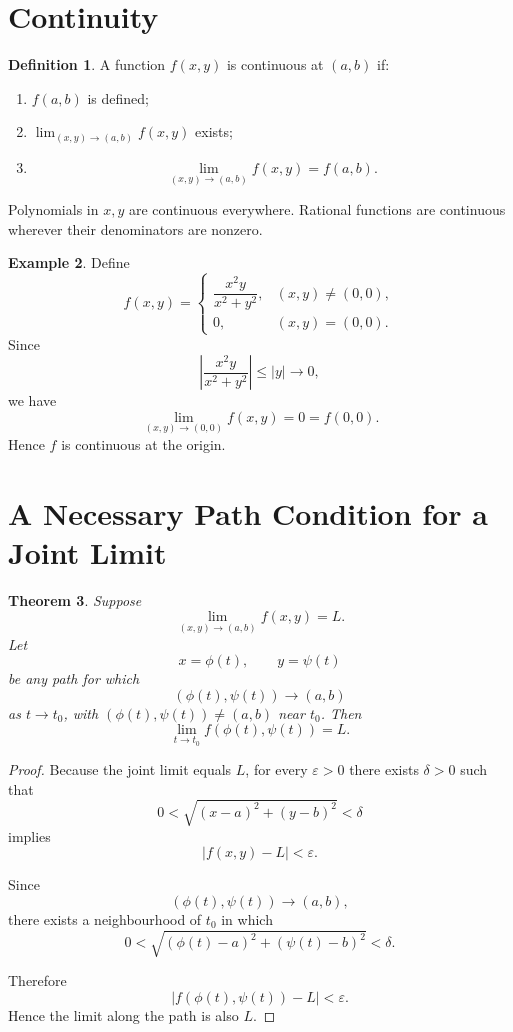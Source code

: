 \documentclass[11pt,oneside]{book}
\theoremstyle{studentthm}
\newtheorem{theorem}{Theorem}[chapter]
\theoremstyle{definition}
\newtheorem{definition}[theorem]{Definition}
\newtheorem{example}[theorem]{Example}
\newcommand{\eps}{\varepsilon}
\newcommand{\abs}[1]{\left|#1\right|}
\begin{document}
\section{Continuity}

\begin{definition}
A function \(f(x,y)\) is continuous at \((a,b)\) if:
\begin{enumerate}
\item \(f(a,b)\) is defined;
\item \(\lim_{(x,y)\to(a,b)}f(x,y)\) exists;
\item
\[
\lim_{(x,y)\to(a,b)}f(x,y)=f(a,b).
\]
\end{enumerate}
\end{definition}

Polynomials in \(x,y\) are continuous everywhere. Rational functions
are continuous wherever their denominators are nonzero.

\begin{example}
Define
\[
f(x,y)=
\begin{cases}
\dfrac{x^2y}{x^2+y^2},&(x,y)\ne(0,0),\\[1ex]
0,&(x,y)=(0,0).
\end{cases}
\]
Since
\[
\abs{\frac{x^2y}{x^2+y^2}}
\le\abs{y}\to0,
\]
we have
\[
\lim_{(x,y)\to(0,0)}f(x,y)=0=f(0,0).
\]
Hence \(f\) is continuous at the origin.
\end{example}


\section{A Necessary Path Condition for a Joint Limit}

\begin{theorem}
Suppose
\[
\lim_{(x,y)\to(a,b)}f(x,y)=L.
\]
Let
\[
x=\phi(t),\qquad y=\psi(t)
\]
be any path for which
\[
(\phi(t),\psi(t))\to(a,b)
\]
as \(t\to t_0\), with \((\phi(t),\psi(t))\ne(a,b)\) near \(t_0\).
Then
\[
\lim_{t\to t_0}f(\phi(t),\psi(t))=L.
\]
\end{theorem}

\begin{proof}
Because the joint limit equals \(L\), for every \(\eps>0\) there exists
\(\delta>0\) such that
\[
0<
\sqrt{(x-a)^2+(y-b)^2}
<\delta
\]
implies
\[
|f(x,y)-L|<\eps.
\]

Since
\[
(\phi(t),\psi(t))\to(a,b),
\]
there exists a neighbourhood of \(t_0\) in which
\[
0<
\sqrt{
(\phi(t)-a)^2+(\psi(t)-b)^2
}
<\delta.
\]

Therefore
\[
|f(\phi(t),\psi(t))-L|<\eps.
\]
Hence the limit along the path is also \(L\).
\end{proof}
\end{document}
